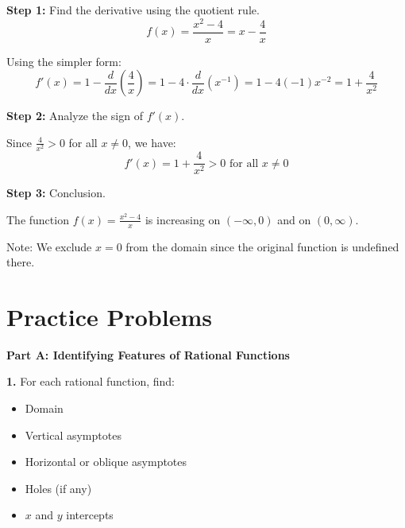 \documentclass[12pt]{article}
\begin{document}
\textbf{Step 1:} Find the derivative using the quotient rule.
$$f(x) = \frac{x^2 - 4}{x} = x - \frac{4}{x}$$

Using the simpler form:
$$f'(x) = 1 - \frac{d}{dx}\left(\frac{4}{x}\right) = 1 - 4 \cdot \frac{d}{dx}(x^{-1}) = 1 - 4(-1)x^{-2} = 1 + \frac{4}{x^2}$$

\textbf{Step 2:} Analyze the sign of $f'(x)$.

Since $\frac{4}{x^2} > 0$ for all $x \neq 0$, we have:
$$f'(x) = 1 + \frac{4}{x^2} > 0 \text{ for all } x \neq 0$$

\textbf{Step 3:} Conclusion.

The function $f(x) = \frac{x^2 - 4}{x}$ is increasing on $(-\infty, 0)$ and on $(0, \infty)$.

Note: We exclude $x = 0$ from the domain since the original function is undefined there.

\newpage

\section{Practice Problems}

\textbf{Part A: Identifying Features of Rational Functions}

\textbf{1.} For each rational function, find:
\begin{itemize}
\item Domain
\item Vertical asymptotes
\item Horizontal or oblique asymptotes
\item Holes (if any)
\item $x$ and $y$ intercepts
\end{itemize}
\end{document}
